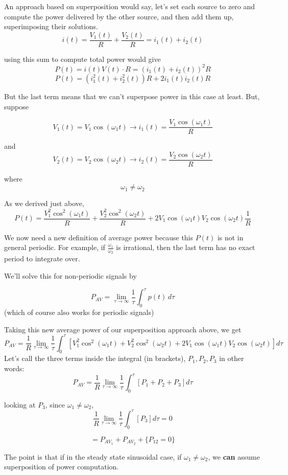 An approach based on superposition would say, let's set each
source to zero and compute the power delivered by the other source,
and then add them up, superimposing their solutions.
\[
i(t) = \frac{V_1(t)}{R} + \frac{V_2(t)}{R} = i_1(t) + i_2(t)
\]

using this sum to compute total power would give
\[
P(t) = i(t) V(t) \cdot R
= \left( i_1(t) + i_2(t) \right)^2 R
\]
\[
P(t) = \left( i_1^2(t) + i_2^2(t) \right) R + 2i_1(t) i_2(t) R
\]

But the last term means that we can't superpose power in this case at least.
But, suppose

\[
V_1(t) = V_1 \cos(\omega_1 t) \rightarrow i_1(t) = \frac{V_1 \cos(\omega_1 t)}{R}
\]

and
\[
V_2(t) = V_2 \cos(\omega_2 t) \rightarrow i_2(t) = \frac{V_2 \cos(\omega_2 t)}{R}
\]


where
\[
\omega_1 \neq \omega_2
\]

As we derived just above,
\[
P(t) = \frac{V_1^2 \cos^2(\omega_1 t)}{R} + \frac{V_2^2 \cos^2(\omega_2 t)}{R} + 2V_1 \cos(\omega_1 t) V_2 \cos(\omega_2 t) \frac{1}{R}
\]


We now need a new definition of average power because this $P(t)$ is not in general periodic.
For example, if $\frac{\omega_1}{\omega_2}$ is irrational, then the last term has no
exact period to integrate over.

We'll solve this for non-periodic signals  by

\[
P_{AV} = \lim_{\tau \rightarrow \infty} \frac{1}{\tau} \int_0^\tau p(t) \, d\tau
\]
(which of course also works for periodic
signals)

Taking this new average power of our superposition approach above, we get
\[
P_{AV} = \frac{1}{R} \lim_{\tau \rightarrow \infty} \frac{1}{\tau} \int_0^\tau \left[ V_1^2 \cos^2(\omega_1 t) + V_2^2 \cos^2(\omega_2 t) + 2V_1 \cos(\omega_1 t) V_2 \cos(\omega_2 t) \right] d\tau
\]
Let's call the three terms inside the integral (in brackets), $P_1, P_2, P_3$ in other words:
\[
P_{AV} =\frac{1}{R} \lim_{\tau \rightarrow \infty} \frac{1}{\tau} \int_0^\tau \left[
P_1 + P_2 + P_3 \right ] d\tau
\]

looking at $P_3$,  since $\omega_1 \neq \omega_2$,
\[
\frac{1}{R} \lim_{\tau \rightarrow \infty} \frac{1}{\tau} \int_0^\tau \left[ P_3 \right ] d\tau = 0
\]

\[
= P_{AV_1} + P_{AV_2} + \{ P_{12} = 0 \}
\]

The point is that if in the steady state sinusoidal case, if $\omega_1 \neq \omega_2$, we {\bf can} assume
superposition of power computation.

